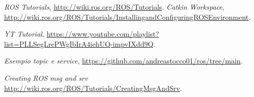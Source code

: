 \begin{thebibliography}{99}
    
 \textit{ROS Tutorials}, \url{http://wiki.ros.org/ROS/Tutorials}.
 \textit{Catkin Workspace}, \url{http://wiki.ros.org/ROS/Tutorials/InstallingandConfiguringROSEnvironment}.

 \textit{YT Tutorial}, \url{https://www.youtube.com/playlist?list=PLLSegLrePWgIbIrA4iehUQ-impvIXdd9Q}.

 \textit{Esempio topic e service}, \url{https://github.com/andreastocco01/ros/tree/main}.

 \textit{Creating ROS msg and srv} \url{http://wiki.ros.org/ROS/Tutorials/CreatingMsgAndSrv}.
\end{thebibliography}
